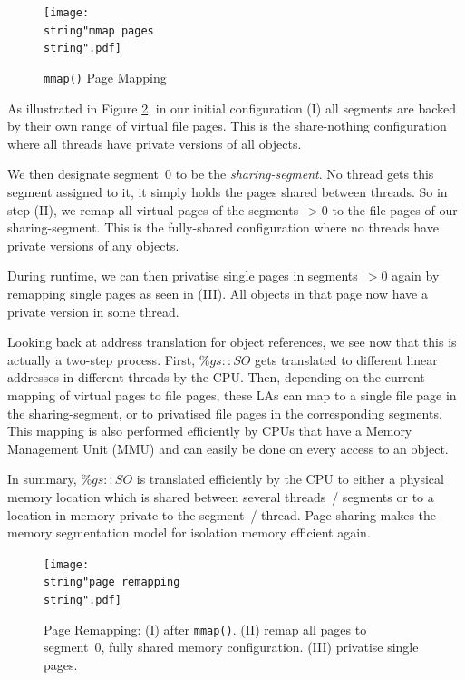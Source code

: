 \documentclass{sigplanconf}
\begin{document}
\begin{figure}[h]
  \begin{centering}
    \texttt{[image: \\string"mmap pages\\string".pdf]}
    \par\end{centering}

    \protect\caption{\texttt{mmap()} Page Mapping\label{fig:mmap()-Page-Mapping}}
\end{figure}


As illustrated in Figure \ref{fig:Page-Remapping}, in our initial
configuration (I) all segments are backed by their own range of
virtual file pages. This is the share-nothing configuration where
all threads have private versions of all objects.

We then designate segment~0 to be the \emph{sharing-segment}. No
thread gets this segment assigned to it, it simply holds the pages
shared between threads. So in step (II), we remap all virtual pages of
the segments~$>0$ to the file pages of our sharing-segment. This is
the fully-shared configuration where no threads have private versions
of any objects.

During runtime, we can then privatise single pages in segments~$>0$
again by remapping single pages as seen in (III). All objects in that
page now have a private version in some thread.

Looking back at address translation for object references, we see now
that this is actually a two-step process. First, $\%gs{::}SO$ gets
translated to different linear addresses in different threads by the
CPU. Then, depending on the current mapping of virtual pages to file
pages, these LAs can map to a single file page in the sharing-segment,
or to privatised file pages in the corresponding segments. This
mapping is also performed efficiently by CPUs that have a Memory
Management Unit (MMU) and can easily be done on every access to an
object.

In summary, $\%gs{::}SO$ is translated efficiently by the CPU to
either a physical memory location which is shared between several
threads~/ segments or to a location in memory private to the segment~/
thread. Page sharing makes the memory segmentation model for isolation
memory efficient again.

\begin{figure}[h]
  \begin{centering}
    \texttt{[image: \\string"page remapping\\string".pdf]}
    \par\end{centering}

    \protect\caption{Page Remapping: (I) after \texttt{mmap()}. (II) remap all pages to
      segment~0, fully shared memory configuration. (III) privatise single
      pages.\label{fig:Page-Remapping}}
\end{figure}
\end{document}
